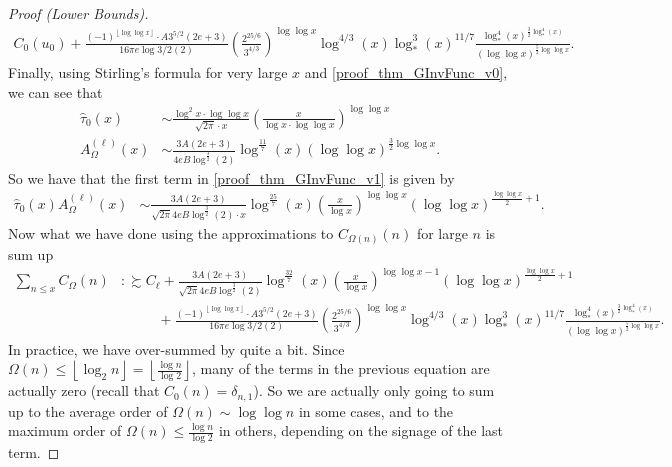 \documentclass[11pt,reqno,a4letter]{article}
\numberwithin{figure}{section}
\numberwithin{table}{section}
\newcommand{\floor}[1]{\left\lfloor #1 \right\rfloor}
\newcommand{\Floor}[2]{\ensuremath{\left\lfloor \frac{#1}{#2} \right\rfloor}}
\theoremstyle{plain}
\numberwithin{theorem}{section}
\theoremstyle{definition}
\begin{document}
\begin{proof}[Proof (Lower Bounds)]
\begin{align}
      C_0(u_0) + \frac{(-1)^{\floor{\log\log x}} \cdot A 3^{5/2} (2e+3)}{16\pi e \log{3/2}(2)} \left( 
      \frac{2^{25/6}}{3^{4/3}}\right)^{\log\log x} \log^{4/3}(x) \log_{\ast}^3(x)^{11/7} 
      \frac{\log_{\ast}^4(x)^{\frac{3}{2}\log_{\ast}^4(x)}}{(\log\log x)^{\frac{5}{2} \log\log x}}. 
\end{align} 
Finally, using Stirling's formula for very large $x$ and 
\eqref{proof_thm_GInvFunc_v0}, we can see that 
\begin{align*} 
\widehat{\tau}_0(x) & \sim \frac{\log^2 x \cdot \log\log x}{\sqrt{2\pi} \cdot x} \left( 
     \frac{x}{\log x \cdot \log\log x}\right)^{\log\log x} \\ 
A_{\Omega}^{(\ell)}(x) & \sim 
     \frac{3A(2e+3)}{4eB \log^{\frac{3}{2}}(2)} \log^{\frac{11}{7}}(x) (\log\log x)^{\frac{3}{2}\log\log x}. 
\end{align*} 
So we have that the first term in \eqref{proof_thm_GInvFunc_v1} is given by 
\begin{align*} 
\widehat{\tau}_0(x) A_{\Omega}^{(\ell)}(x) & \sim 
     \frac{3A(2e+3)}{\sqrt{2\pi}4eB \log^{\frac{3}{2}}(2) \cdot x}
     \log^{\frac{25}{7}}(x) \left( 
     \frac{x}{\log x}\right)^{\log\log x} (\log\log x)^{\frac{\log\log x}{2}+1}. 
\end{align*} 
Now what we have done using the approximations to $C_{\Omega(n)}(n)$ for large $n$ is sum up 
\begin{align*} 
\sum_{n \leq x} C_{\Omega}(n) & :\succsim C_{\ell} + 
     \frac{3A(2e+3)}{\sqrt{2\pi}4eB \log^{\frac{3}{2}}(2)}
     \log^{\frac{32}{7}}(x) \left( 
     \frac{x}{\log x}\right)^{\log\log x-1} (\log\log x)^{\frac{\log\log x}{2}+1} \\ 
     & \phantom{\succsim C_{\ell}\ } + 
     \frac{(-1)^{\floor{\log\log x}} \cdot A 3^{5/2} (2e+3)}{16\pi e \log{3/2}(2)} \left( 
      \frac{2^{25/6}}{3^{4/3}}\right)^{\log\log x} \log^{4/3}(x) \log_{\ast}^3(x)^{11/7} 
      \frac{\log_{\ast}^4(x)^{\frac{3}{2}\log_{\ast}^4(x)}}{(\log\log x)^{\frac{5}{2} \log\log x}}.
\end{align*} 
In practice, we have over-summed by quite a bit. Since $\Omega(n) \leq \floor{\log_2 n} = \Floor{\log n}{\log 2}$, 
many of the terms in the previous equation are actually zero (recall that $C_0(n) = \delta_{n,1}$). 
So we are actually only going to sum up to the average order of 
$\Omega(n) \sim \log\log n$ in some cases, and to the maximum order of $\Omega(n) \leq \frac{\log n}{\log 2}$ in 
others, depending on the signage of the last term. 


\end{proof}
\end{document}
